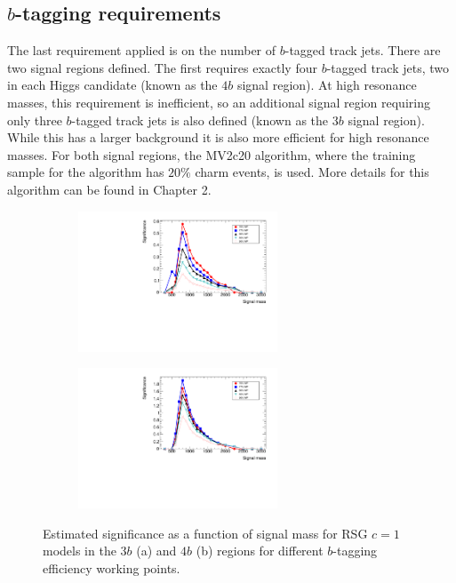 \subsection{$b$-tagging requirements}

The last requirement applied is on the number of $b$-tagged track jets. There are two signal regions defined. The first requires exactly four $b$-tagged track jets, two in each Higgs candidate (known as the $4b$ signal region). At high resonance masses, this requirement is inefficient, so an additional signal region requiring only three $b$-tagged track jets is also defined (known as the $3b$ signal region). While this has a larger background it is also more efficient for high resonance masses. For both signal regions, the MV2c20 algorithm, where the training sample for the algorithm has $20\%$ charm events, is used. More details for this algorithm can be found in Chapter 2.  

\begin{figure}[h!]
  \centering
  \captionsetup{justification=centering}

   \begin{subfigure}[t]{0.5\textwidth}
        \centering
        \includegraphics[width=0.65\textwidth,angle=270]{figures/sig_optimization_3b}
        \caption{}
    \end{subfigure}%
    \begin{subfigure}[t]{0.5\textwidth}
        \centering
        \includegraphics[width=0.65\textwidth,angle=270]{figures/sig_optimization_4b}
        \caption{}
    \end{subfigure}

   \caption{Estimated significance as a function of signal mass for RSG $c=1$ models in the $3b$ (a) and $4b$ (b) regions for different $b$-tagging efficiency working points.}
  \label{fig:4b_sig_opt}
\end{figure}

